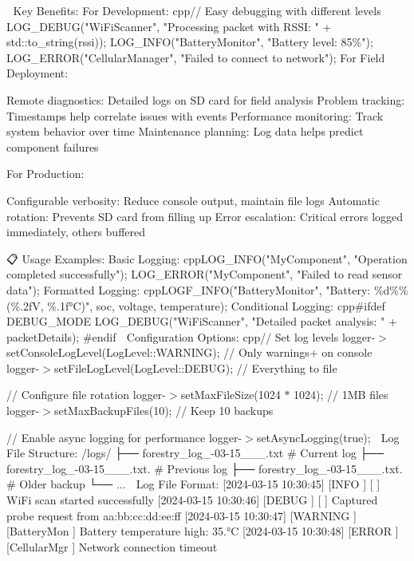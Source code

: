 🎯 Key Benefits\+: For Development\+: cpp// Easy debugging with different levels LOG\+\_\+\+DEBUG("{}\+Wi\+Fi\+Scanner"{}, "{}\+Processing packet with RSSI\+: "{} + std\+::to\+\_\+string(rssi)); LOG\+\_\+\+INFO("{}\+Battery\+Monitor"{}, "{}\+Battery level\+: 85\%"{}); LOG\+\_\+\+ERROR("{}\+Cellular\+Manager"{}, "{}\+Failed to connect to network"{}); For Field Deployment\+:

Remote diagnostics\+: Detailed logs on SD card for field analysis Problem tracking\+: Timestamps help correlate issues with events Performance monitoring\+: Track system behavior over time Maintenance planning\+: Log data helps predict component failures

For Production\+:

Configurable verbosity\+: Reduce console output, maintain file logs Automatic rotation\+: Prevents SD card from filling up Error escalation\+: Critical errors logged immediately, others buffered

📋 Usage Examples\+: Basic Logging\+: cpp\+LOG\+\_\+\+INFO("{}\+My\+Component"{}, "{}\+Operation completed successfully"{}); LOG\+\_\+\+ERROR("{}\+My\+Component"{}, "{}\+Failed to read sensor data"{}); Formatted Logging\+: cpp\+LOGF\+\_\+\+INFO("{}\+Battery\+Monitor"{}, "{}\+Battery\+: \%d\%\% (\%.\+2f\+V, \%.\+1f°\+C)"{}, soc, voltage, temperature); Conditional Logging\+: cpp\#ifdef DEBUG\+\_\+\+MODE LOG\+\_\+\+DEBUG("{}\+Wi\+Fi\+Scanner"{}, "{}\+Detailed packet analysis\+: "{} + packet\+Details); \#endif 🔧 Configuration Options\+: cpp// Set log levels logger-\/\texorpdfstring{$>$}{>}set\+Console\+Log\+Level(\+Log\+Level\+::\+WARNING); // Only warnings+ on console logger-\/\texorpdfstring{$>$}{>}set\+File\+Log\+Level(\+Log\+Level\+::\+DEBUG); // Everything to file

// Configure file rotation logger-\/\texorpdfstring{$>$}{>}set\+Max\+File\+Size(1024 \texorpdfstring{$\ast$}{*} 1024); // 1MB files logger-\/\texorpdfstring{$>$}{>}set\+Max\+Backup\+Files(10); // Keep 10 backups

// Enable async logging for performance logger-\/\texorpdfstring{$>$}{>}set\+Async\+Logging(true); 📁 Log File Structure\+: /logs/ ├── forestry\+\_\+log\+\_-\/03-\/15\+\_\+\_\+\_.\+txt \# Current log ├── forestry\+\_\+log\+\_-\/03-\/15\+\_\+\_\+\_.\+txt. \# Previous log ├── forestry\+\_\+log\+\_-\/03-\/15\+\_\+\_\+\_.\+txt. \# Older backup └── ... 🎨 Log File Format\+: \mbox{[}2024-\/03-\/15 10\+:30\+:45\mbox{]} \mbox{[}INFO \mbox{]} \mbox{[} \mbox{]} Wi\+Fi scan started successfully \mbox{[}2024-\/03-\/15 10\+:30\+:46\mbox{]} \mbox{[}DEBUG \mbox{]} \mbox{[} \mbox{]} Captured probe request from aa\+:bb\+:cc\+:dd\+:ee\+:ff \mbox{[}2024-\/03-\/15 10\+:30\+:47\mbox{]} \mbox{[}WARNING \mbox{]} \mbox{[}Battery\+Mon \mbox{]} Battery temperature high\+: 35.°C \mbox{[}2024-\/03-\/15 10\+:30\+:48\mbox{]} \mbox{[}ERROR \mbox{]} \mbox{[}Cellular\+Mgr \mbox{]} Network connection timeout 